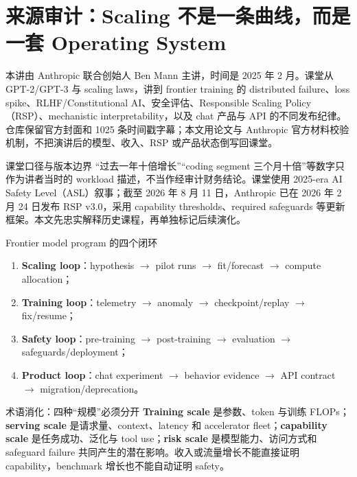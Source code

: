\documentclass[a4paper]{article}
\begin{document}
\makecscover

\section{来源审计：Scaling 不是一条曲线，而是一套 Operating System}

本讲由 Anthropic 联合创始人 Ben Mann 主讲，时间是 2025 年 2 月。课堂从 GPT-2/GPT-3 与 scaling laws，讲到 frontier training 的 distributed failure、loss spike、RLHF/Constitutional AI、安全评估、Responsible Scaling Policy（RSP）、mechanistic interpretability，以及 chat 产品与 API 的不同发布纪律。仓库保留官方封面和 1025 条时间戳字幕；本文用论文与 Anthropic 官方材料校验机制，不把演讲后的模型、收入、RSP 或产品状态倒写回课堂。

\begin{warningbox}{课堂口径与版本边界}
“过去一年十倍增长”“coding segment 三个月十倍”等数字只作为讲者当时的 workload 描述，不当作经审计财务结论。课堂使用 2025-era AI Safety Level（ASL）叙事；截至 2026 年 8 月 11 日，Anthropic 已在 2026 年 2 月 24 日发布 RSP v3.0，采用 capability thresholds、required safeguards 等更新框架。本文先忠实解释历史课程，再单独标记后续演化。
\end{warningbox}

\begin{importantbox}{Frontier model program 的四个闭环}
\begin{enumerate}
  \item \textbf{Scaling loop}：hypothesis $\rightarrow$ pilot runs $\rightarrow$ fit/forecast $\rightarrow$ compute allocation；
  \item \textbf{Training loop}：telemetry $\rightarrow$ anomaly $\rightarrow$ checkpoint/replay $\rightarrow$ fix/resume；
  \item \textbf{Safety loop}：pre-training $\rightarrow$ post-training $\rightarrow$ evaluation $\rightarrow$ safeguards/deployment；
  \item \textbf{Product loop}：chat experiment $\rightarrow$ behavior evidence $\rightarrow$ API contract $\rightarrow$ migration/deprecation。
\end{enumerate}
\end{importantbox}

\begin{knowledgebox}{术语消化：四种“规模”必须分开}
\textbf{Training scale} 是参数、token 与训练 FLOPs；\textbf{serving scale} 是请求量、context、latency 和 accelerator fleet；\textbf{capability scale} 是任务成功、泛化与 tool use；\textbf{risk scale} 是模型能力、访问方式和 safeguard failure 共同产生的潜在影响。收入或流量增长不能直接证明 capability，benchmark 增长也不能自动证明 safety。
\end{knowledgebox}
\end{document}
